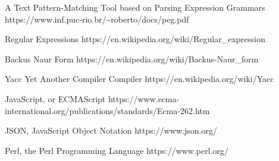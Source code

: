 \begin{thebibliography}{12}

  A Text Pattern-Matching Tool based on Parsing Expression Grammars
  https://www.inf.puc-rio.br/\~{}roberto/docs/peg.pdf

  Regular Expressions
  https://en.wikipedia.org/wiki/Regular\_expression

  Backus Naur Form
  https://en.wikipedia.org/wiki/Backus-Naur\_form

  Yacc Yet Another Compiler Compiler
  https://en.wikipedia.org/wiki/Yacc

  JavaScript, or ECMAScript
  https://www.ecma-international.org/publications/standards/Ecma-262.htm

  JSON, JavaScript Object Notation
  https://www.json.org/

  Perl, the Perl Programming Language
  https://www.perl.org/

\end{thebibliography}
